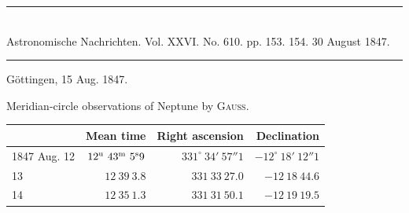 \clearpage
{}
\hypertarget{native-477-lower}{}
\begin{center}
\rule{0.55\linewidth}{0.4pt}\\[2pt]
Astronomische Nachrichten. Vol. XXVI. No. 610. pp. 153. 154. 30 August 1847.\\[2pt]
\rule{0.55\linewidth}{0.4pt}
\end{center}
\begin{flushright}Göttingen, 15 Aug. 1847.\end{flushright}

Meridian-circle observations of Neptune by \textsc{Gauss}.

\begin{center}
\setlength{\tabcolsep}{3pt}
\begin{tabular}{l|r|r|r}
 & Mean time & Right ascension & Declination \\\hline
1847 Aug. 12 & $12^{\rm u}\ 43^{\rm m}\ 5^{\rm s}9$ & $331^\circ\ 34'\ 57''1$ & $-12^\circ\ 18'\ 12''1$ \\
\hfill 13 & $12\ 39\ 3.8$ & $331\ 33\ 27.0$ & $-12\ 18\ 44.6$ \\
\hfill 14 & $12\ 35\ 1.3$ & $331\ 31\ 50.1$ & $-12\ 19\ 19.5$ \\
\end{tabular}
\end{center}

